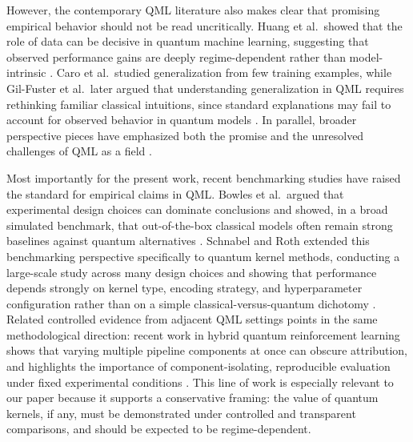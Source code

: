 \documentclass[journal]{IEEEtran}
\begin{document}
However, the contemporary QML literature also makes clear that promising empirical behavior should not be read uncritically. Huang et al.\ showed that the role of data can be decisive in quantum machine learning, suggesting that observed performance gains are deeply regime-dependent rather than model-intrinsic \cite{huang2021powerofdata}. Caro et al.\ studied generalization from few training examples, while Gil-Fuster et al.\ later argued that understanding generalization in QML requires rethinking familiar classical intuitions, since standard explanations may fail to account for observed behavior in quantum models \cite{caro2022generalization,gilfuster2024rethinkinggeneralization}. In parallel, broader perspective pieces have emphasized both the promise and the unresolved challenges of QML as a field \cite{cerezo2022qmlchallenges}.

Most importantly for the present work, recent benchmarking studies have raised the standard for empirical claims in QML. Bowles et al.\ argued that experimental design choices can dominate conclusions and showed, in a broad simulated benchmark, that out-of-the-box classical models often remain strong baselines against quantum alternatives \cite{bowles2024betterthanclassical}. Schnabel and Roth extended this benchmarking perspective specifically to quantum kernel methods, conducting a large-scale study across many design choices and showing that performance depends strongly on kernel type, encoding strategy, and hyperparameter configuration rather than on a simple classical-versus-quantum dichotomy \cite{schnabel2025scrutiny}. Related controlled evidence from adjacent QML settings points in the same methodological direction: recent work in hybrid quantum reinforcement learning shows that varying multiple pipeline components at once can obscure attribution, and highlights the importance of component-isolating, reproducible evaluation under fixed experimental conditions \cite{lazaro2025dissectingqrl}. This line of work is especially relevant to our paper because it supports a conservative framing: the value of quantum kernels, if any, must be demonstrated under controlled and transparent comparisons, and should be expected to be regime-dependent.
\end{document}
